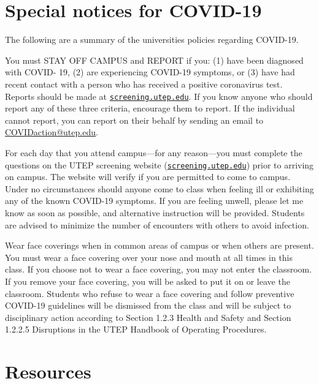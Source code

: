 \documentclass[12pt]{scrartcl}
\begin{document}
\section{Special notices for COVID-19}

The following are a summary of the universities policies regarding COVID-19.

You must STAY OFF CAMPUS and REPORT if you:
(1) have been diagnosed with COVID- 19, 
(2) are experiencing COVID-19 symptoms, or 
(3) have had recent contact with a person who has received a positive coronavirus test. 
Reports should be made at \href{http://screening.utep.edu}{\texttt{screening.utep.edu}}. 
If you know anyone who should report any of these three criteria, encourage them to report. 
If the individual cannot report, you can report on their behalf by sending an email to \url{COVIDaction@utep.edu}.

For each day that you attend campus—for any reason—you must complete the questions on the UTEP screening website (\href{http://screening.utep.edu}{\texttt{screening.utep.edu}}) prior to arriving on campus. 
The website will verify if you are permitted to come to campus. 
Under no circumstances should anyone come to class when feeling ill or exhibiting any of the known COVID-19 symptoms. 
If you are feeling unwell, please let me know as soon as possible, 
and alternative instruction will be provided. Students are advised to minimize the number of encounters with others to avoid infection.

Wear face coverings when in common areas of campus or when others are present. 
You must wear a face covering over your nose and mouth at all times in this class. 
If you choose not to wear a face covering, you may not enter the classroom. 
If you remove your face covering, you will be asked to put it on or leave the classroom. 
Students who refuse to wear a face covering and follow preventive COVID-19 guidelines will be dismissed from the class and will be subject to disciplinary action according to Section 1.2.3 Health and Safety and Section 1.2.2.5 Disruptions in the UTEP Handbook of Operating Procedures.


\section{Resources}
\end{document}
